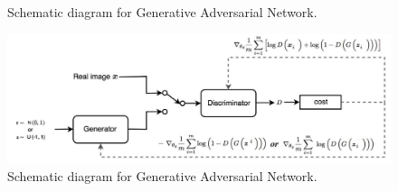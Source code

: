 \begin{figure}
\begin{adjustbox}{width=\textwidth}


	\end{adjustbox}
	\caption{Schematic diagram for Generative Adversarial Network\cite{ponti2017}.}\label{fig:gan}

\end{figure}
\begin{figure}
	\begin{adjustbox}{width=\textwidth}
		\includegraphics[]{figures/neural_networks/gan.jpeg}
	\end{adjustbox}
	\caption{Schematic diagram for Generative Adversarial Network\cite{ponti2017}.}\label{fig:gan}

\end{figure}

